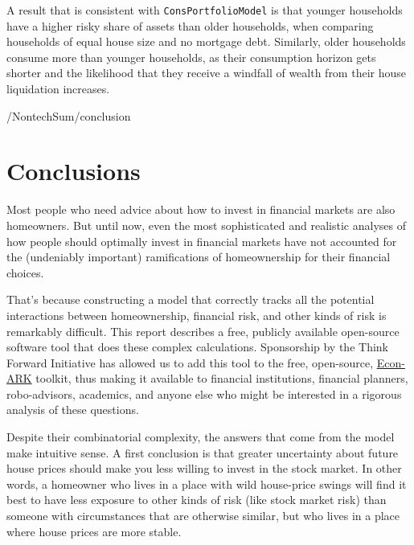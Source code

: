 \documentclass[PortfolioChoiceWithRiskyHousing]{subfiles}
\begin{document}
A result that is consistent with \texttt{ConsPortfolioModel} is that younger households have a higher risky share of assets than older households, when comparing households of equal house size and no mortgage debt. Similarly, older households consume more than younger households, as their consumption horizon gets shorter and the likelihood that they receive a windfall of wealth from their house liquidation increases.

\renewcommand{\figName}{shareFuncByRetirement}
\renewcommand{\figFile}{\figName}

\renewcommand{\figName}{cFuncByRetirement}
\renewcommand{\figFile}{\figName}

\begin{verbatimwrite}{\LaTeXOutput/NontechSum/conclusion}

  \section{Conclusions}

  Most people who need advice about how to invest in financial markets are also homeowners. But until now, even the most sophisticated and realistic analyses of how people should optimally invest in financial markets have not accounted for the (undeniably important) ramifications of homeownership for their financial choices.

  That's because constructing a model that correctly tracks all the potential interactions between homeownership, financial risk, and other kinds of risk is remarkably difficult. This report describes a free, publicly available open-source software tool that does these complex calculations.  Sponsorship by the Think Forward Initiative has allowed us to add this tool to the free, open-source, \href{https://econ-ark.org}{Econ-ARK} toolkit, thus making it available to financial institutions, financial planners, robo-advisors, academics, and anyone else who might be interested in a rigorous analysis of these questions.

  Despite their combinatorial complexity, the answers that come from the model make intuitive sense. A first conclusion is that greater uncertainty about future house prices should make you less willing to invest in the stock market.  In other words, a homeowner who lives in a place with wild house-price swings will find it best to have less exposure to other kinds of risk (like stock market risk) than someone with circumstances that are otherwise similar, but who lives in a place where house prices are more stable.


\end{verbatimwrite}
\end{document}
